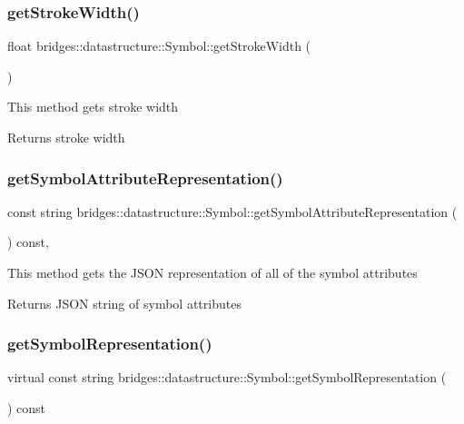 \subsubsection{\texorpdfstring{getStrokeWidth()}{getStrokeWidth()}}
{\footnotesize\ttfamily float bridges\+::datastructure\+::\+Symbol\+::get\+Stroke\+Width (\begin{DoxyParamCaption}{ }\end{DoxyParamCaption})\hspace{0.3cm}{\ttfamily [inline]}}

This method gets stroke width

\begin{DoxyReturn}{Returns}
stroke width 
\end{DoxyReturn}
\mbox{\label{classbridges_1_1datastructure_1_1_symbol_ab9a92e73867a95e8cc3e63cad75d266a}} 
\subsubsection{\texorpdfstring{getSymbolAttributeRepresentation()}{getSymbolAttributeRepresentation()}}
{\footnotesize\ttfamily const string bridges\+::datastructure\+::\+Symbol\+::get\+Symbol\+Attribute\+Representation (\begin{DoxyParamCaption}{ }\end{DoxyParamCaption}) const\hspace{0.3cm}{\ttfamily [inline]}, {\ttfamily [protected]}}

This method gets the J\+S\+ON representation of all of the symbol attributes

\begin{DoxyReturn}{Returns}
J\+S\+ON string of symbol attributes 
\end{DoxyReturn}
\mbox{\label{classbridges_1_1datastructure_1_1_symbol_a8044b3da559dcd9de8510ae339f126c8}} 
\subsubsection{\texorpdfstring{getSymbolRepresentation()}{getSymbolRepresentation()}}
{\footnotesize\ttfamily virtual const string bridges\+::datastructure\+::\+Symbol\+::get\+Symbol\+Representation (\begin{DoxyParamCaption}{ }\end{DoxyParamCaption}) const\hspace{0.3cm}{\ttfamily [pure virtual]}}

